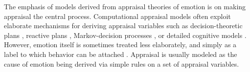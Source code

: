 \documentclass[11pt]{article}
\begin{document}
The emphasis of models derived from appraisal theories of emotion is on
making appraisal the central process. Computational appraisal models often
exploit elaborate mechanisms for deriving appraisal variables such as
decision-theoretic plans \cite{gratch:domain-independent}
\cite{marsella:ema-process-model}, reactive plans
\cite{rank:appraisal-story-world} \cite{neal:modeling-antecedents}
\cite{staller:emotion-social-norm}, Markov-decision processes
\cite{elnasr:flame} \cite{si:modeling-appraisal-tom-journal}, or detailed
cognitive models \cite{marinier:behavior-emotion}. However, emotion itself is
sometimes treated less elaborately, and simply as a label to which behavior can
be attached \cite{elliott:affective-reasoner}. Appraisal is usually modeled as
the cause of emotion being derived via simple rules on a set of appraisal
variables.
\end{document}
